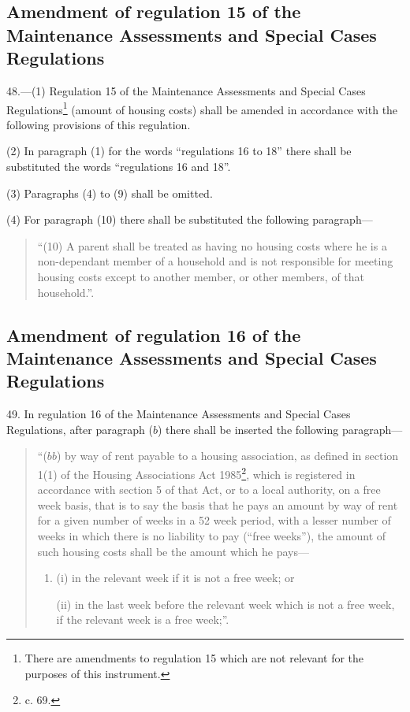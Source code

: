 \documentclass[a4paper]{article}
\begin{document}
\subsection[48. Amendment of regulation 15 of the Maintenance Assessments and Special Cases Regulations]{Amendment of regulation 15 of the Maintenance Assessments and Special Cases Regulations}

48.—(1) Regulation 15 of the Maintenance Assessments and Special Cases Regulations\footnote{\frenchspacing There are amendments to regulation 15 which are not relevant for the purposes of this instrument.} (amount of housing costs) shall be amended in accordance with the following provisions of this regulation.

(2) In paragraph (1) for the words “regulations 16 to 18” there shall be substituted the words “regulations 16 and 18”. 

(3) Paragraphs (4) to (9) shall be omitted.

(4) For paragraph (10) there shall be substituted the following paragraph—
\begin{quotation}
“(10) A parent shall be treated as having no housing costs where he is a non-dependant member of a household and is not responsible for meeting housing costs except to another member, or other members, of that household.”.
\end{quotation}

\subsection[49. Amendment of regulation 16 of the Maintenance Assessments and Special Cases Regulations]{Amendment of regulation 16 of the Maintenance Assessments and Special Cases Regulations}

49.  In regulation 16 of the Maintenance Assessments and Special Cases Regulations, after paragraph ($b$) there shall be inserted the following paragraph—
\begin{quotation}
“($bb$) by way of rent payable to a housing association, as defined in section 1(1) of the Housing Associations Act 1985\footnote{ c. 69.}, which is registered in accordance with section 5 of that Act, or to a local authority, on a free week basis, that is to say the basis that he pays an amount by way of rent for a given number of weeks in a 52 week period, with a lesser number of weeks in which there is no liability to pay (“free weeks”), the amount of such housing costs shall be the amount which he pays---
\begin{enumerate}\item[]
(i) in the relevant week if it is not a free week; or

(ii) in the last week before the relevant week which is not a free week, if the relevant week is a free week;”.
\end{enumerate}
\end{quotation}
\end{document}
